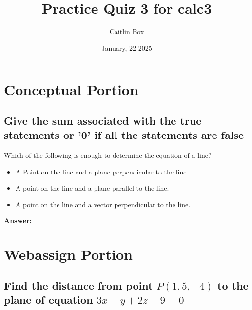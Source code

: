 \documentclass{article}
\title{Practice Quiz 3 for calc3}
\author{Caitlin Box }
\date{January, 22 2025}
\begin{document}
\maketitle

\section{Conceptual Portion}
\vspace{1cm}
\subsection{Give the sum associated with the true statements or '0' if all the statements are false}
\vspace{.7cm}
Which of the following is enough to determine the equation of a line?
\vspace{.1cm}
\begin{itemize}
    \item A Point on the line and a plane perpendicular to the line.
    \item A point on the line and a plane parallel to the line.
    \item A point on the line and a vector perpendicular to the line.
\end{itemize}
\vspace{.5cm}
{\centering \textbf{Answer: \_\_\_\_\_} \par}

\section{Webassign Portion}
\vspace{.5cm}
\subsection{Find the distance from point \( P(1, 5, -4) \) to the plane of equation \( 3x - y + 2z - 9 = 0 \)}
\end{document}
